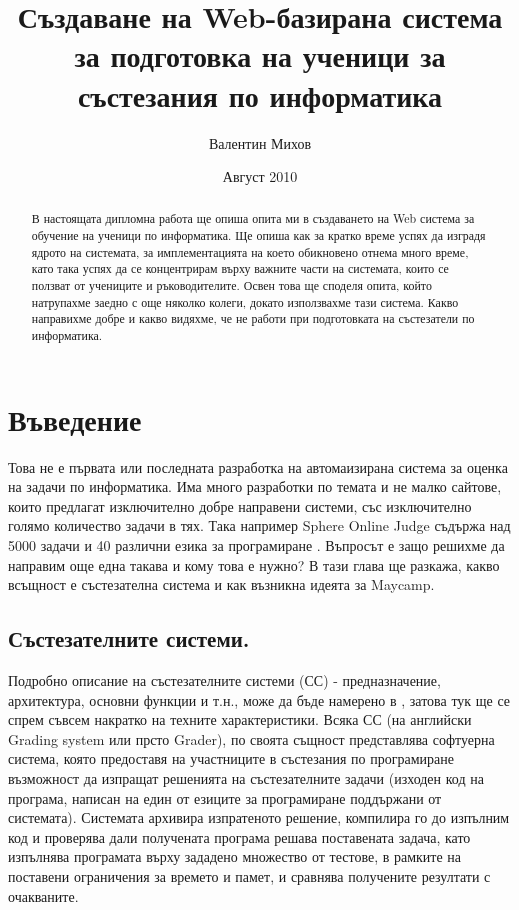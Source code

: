 \documentclass[a4paper,12pt]{article}
\begin{document}
  \title{Създаване на Web-базирана система за подготовка на ученици за състезания по информатика}
  \author{Валентин Михов}
  \date{Август 2010}
  
  \maketitle
  
  \begin{abstract}
    
    В настоящата дипломна работа ще опиша опита ми в създаването на Web система за обучение на ученици по информатика. Ще опиша как за кратко време успях да изградя ядрото на системата, за имплементацията на което обикновено отнема много време, като така успях да се концентрирам върху важните части на системата, които се ползват от учениците и ръководителите. Освен това ще споделя опита, който натрупахме заедно с още няколко колеги, докато използвахме тази система. Какво направихме добре и какво видяхме, че не работи при подготовката на състезатели по информатика.
  \end{abstract}
  
  \newpage

  \tableofcontents
  
  \newpage
  
  \listoffigures
  
  \newpage
  
  \section{Въведение}
    Това не е първата или последната разработка на автомаизирана система за оценка на задачи по информатика. Има много разработки по темата и не малко сайтове, които предлагат изключително добре направени системи, със изключително голямо количество задачи в тях. Така например Sphere Online Judge съдържа над 5000 задачи и 40 различни езика за програмиране \cite{online_judge_list}. Въпросът е защо решихме да направим още една такава и кому това е нужно? В тази глава ще разкажа, какво всъщност е състезателна система и как възникна идеята за Maycamp.
    
    \subsection{Състезателните системи.} Подробно описание на състезателните системи (СС) - предназначение, архитектура, основни функции и т.н., може да бъде намерено в \cite{grading_sys_manev}, затова тук ще се спрем съвсем накратко на техните характеристики. Всяка СС (на английски Grading system или прсто Grader), по своята същност представлява софтуерна система, която предоставя на участниците в състезания по програмиране възможност да изпращат решенията на състезателните задачи (изходен код на програма, написан на един от езиците за програмиране поддържани от системата). Системата архивира изпратеното решение, компилира го до изпълним код и проверява дали получената програма решава поставената задача, като изпълнява програмата върху зададено множество от тестове, в рамките на поставени ограничения за времето и памет, и сравнява получените резултати с очакваните. 
\end{document}
